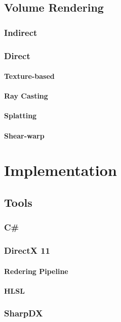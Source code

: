 \documentclass[english, 11pt]{report}
\begin{document}



\section{Volume Rendering}
\subsection{Indirect}
\subsection{Direct}
\subsubsection{Texture-based}
\subsubsection{Ray Casting}
\subsubsection{Splatting}
\subsubsection{Shear-warp}

\chapter{Implementation}
\section{Tools}
\subsection{C\#}
\subsection{DirectX 11}
\subsubsection{Redering Pipeline}
\subsubsection{HLSL}
\subsection{SharpDX}
\end{document}
